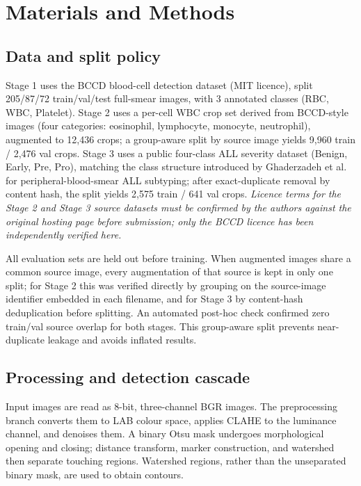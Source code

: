 \documentclass[conference]{IEEEtran}
\begin{document}
\section{Materials and Methods}

\subsection{Data and split policy}

Stage 1 uses the BCCD blood-cell detection dataset \cite{ref_bccd} (MIT licence), split 205/87/72 train/val/test full-smear images, with 3 annotated classes (RBC, WBC, Platelet). Stage 2 uses a per-cell WBC crop set derived from BCCD-style images (four categories: eosinophil, lymphocyte, monocyte, neutrophil), augmented to 12{,}436 crops; a group-aware split by source image yields 9{,}960 train / 2{,}476 val crops. Stage 3 uses a public four-class ALL severity dataset (Benign, Early, Pre, Pro), matching the class structure introduced by Ghaderzadeh et al. \cite{ref_ghaderzadeh} for peripheral-blood-smear ALL subtyping; after exact-duplicate removal by content hash, the split yields 2{,}575 train / 641 val crops. \emph{Licence terms for the Stage 2 and Stage 3 source datasets must be confirmed by the authors against the original hosting page before submission; only the BCCD licence has been independently verified here.}

All evaluation sets are held out before training. When augmented images share a common source image, every augmentation of that source is kept in only one split; for Stage 2 this was verified directly by grouping on the source-image identifier embedded in each filename, and for Stage 3 by content-hash deduplication before splitting. An automated post-hoc check confirmed zero train/val source overlap for both stages. This group-aware split prevents near-duplicate leakage and avoids inflated results.

\subsection{Processing and detection cascade}

Input images are read as 8-bit, three-channel BGR images. The preprocessing branch converts them to LAB colour space, applies CLAHE to the luminance channel, and denoises them. A binary Otsu mask undergoes morphological opening and closing; distance transform, marker construction, and watershed then separate touching regions. Watershed regions, rather than the unseparated binary mask, are used to obtain contours.
\end{document}
